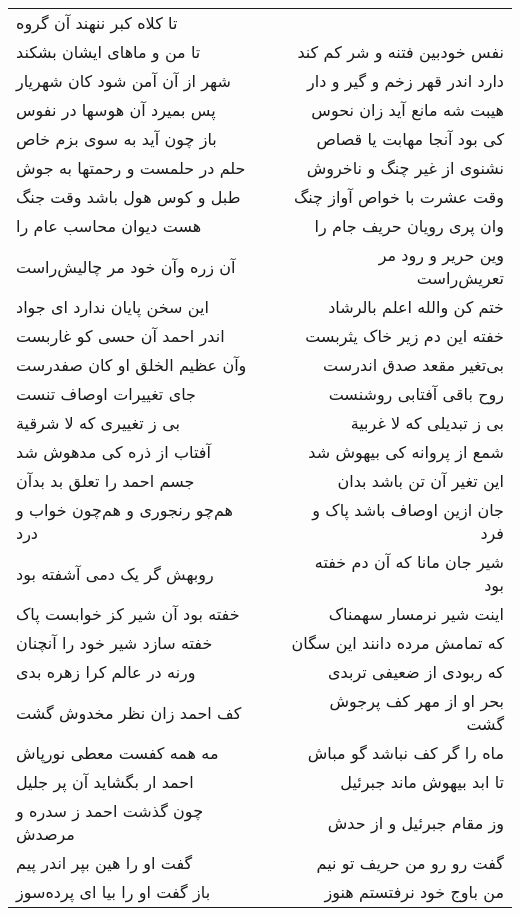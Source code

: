 \begin{center}
\begin{longtable}{l p{0.5cm} r}
تا کلاه کبر ننهند آن گروه
\\
تا من و ماهای ایشان بشکند
&&
نفس خودبین فتنه و شر کم کند
\\
شهر از آن آمن شود کان شهریار
&&
دارد اندر قهر زخم و گیر و دار
\\
پس بمیرد آن هوسها در نفوس
&&
هیبت شه مانع آید زان نحوس
\\
باز چون آید به سوی بزم خاص
&&
کی بود آنجا مهابت یا قصاص
\\
حلم در حلمست و رحمتها به جوش
&&
نشنوی از غیر چنگ و ناخروش
\\
طبل و کوس هول باشد وقت جنگ
&&
وقت عشرت با خواص آواز چنگ
\\
هست دیوان محاسب عام را
&&
وان پری رویان حریف جام را
\\
آن زره وآن خود مر چالیش‌راست
&&
وین حریر و رود مر تعریش‌راست
\\
این سخن پایان ندارد ای جواد
&&
ختم کن والله اعلم بالرشاد
\\
اندر احمد آن حسی کو غاربست
&&
خفته این دم زیر خاک یثربست
\\
وآن عظیم الخلق او کان صفدرست
&&
بی‌تغیر مقعد صدق اندرست
\\
جای تغییرات اوصاف تنست
&&
روح باقی آفتابی روشنست
\\
بی ز تغییری که لا شرقیة
&&
بی ز تبدیلی که لا غربیة
\\
آفتاب از ذره کی مدهوش شد
&&
شمع از پروانه کی بیهوش شد
\\
جسم احمد را تعلق بد بدآن
&&
این تغیر آن تن باشد بدان
\\
هم‌چو رنجوری و هم‌چون خواب و درد
&&
جان ازین اوصاف باشد پاک و فرد
\\
روبهش گر یک دمی آشفته بود
&&
شیر جان مانا که آن دم خفته بود
\\
خفته بود آن شیر کز خوابست پاک
&&
اینت شیر نرمسار سهمناک
\\
خفته سازد شیر خود را آنچنان
&&
که تمامش مرده دانند این سگان
\\
ورنه در عالم کرا زهره بدی
&&
که ربودی از ضعیفی تربدی
\\
کف احمد زان نظر مخدوش گشت
&&
بحر او از مهر کف پرجوش گشت
\\
مه همه کفست معطی نورپاش
&&
ماه را گر کف نباشد گو مباش
\\
احمد ار بگشاید آن پر جلیل
&&
تا ابد بیهوش ماند جبرئیل
\\
چون گذشت احمد ز سدره و مرصدش
&&
وز مقام جبرئیل و از حدش
\\
گفت او را هین بپر اندر پیم
&&
گفت رو رو من حریف تو نیم
\\
باز گفت او را بیا ای پرده‌سوز
&&
من باوج خود نرفتستم هنوز

\end{longtable}
\end{center}
